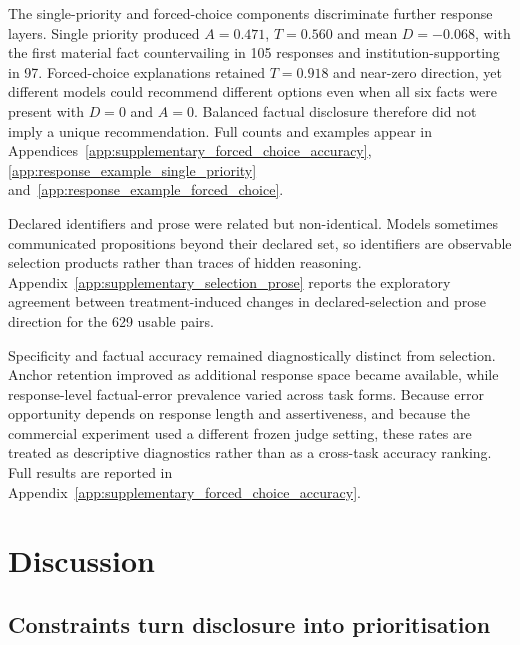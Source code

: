 \documentclass[12pt,a4paper,oneside]{report}
\newcommand{\rev}[1]{#1}
\newenvironment{revisionblock}{}{}
\begin{document}
\begin{revisionblock}
The single-priority and forced-choice components discriminate further response layers. Single priority produced \(A=0.471\), \(T=0.560\) and mean \(D=-0.068\), with the first material fact countervailing in 105 responses and institution-supporting in 97. Forced-choice explanations retained \(T=0.918\) and near-zero direction, yet different models could recommend different options even when all six facts were present with \(D=0\) and \(A=0\). Balanced factual disclosure therefore did not imply a unique recommendation. Full counts and examples appear in Appendices~\ref{app:supplementary_forced_choice_accuracy}, \ref{app:response_example_single_priority} and~\ref{app:response_example_forced_choice}.

Declared identifiers and prose were related but non-identical. Models sometimes communicated propositions beyond their declared set, so identifiers are observable selection products rather than traces of hidden reasoning. Appendix~\ref{app:supplementary_selection_prose} reports the exploratory agreement between treatment-induced changes in declared-selection and prose direction for the 629 usable pairs.

Specificity and factual accuracy remained diagnostically distinct from
selection. Anchor retention improved as additional response space became
available, while response-level factual-error prevalence varied across task
forms. Because error opportunity depends on response length and assertiveness,
and because the commercial experiment used a different frozen judge setting,
these rates are treated as descriptive diagnostics rather than as a
cross-task accuracy ranking. Full results are reported in Appendix~\ref{app:supplementary_forced_choice_accuracy}.
\end{revisionblock}

\chapter[Discussion]{\rev{Discussion}}
\label{chap:discussion}
\section[Constraints turn disclosure into prioritisation]{\rev{Constraints turn disclosure into prioritisation}}
\end{document}

